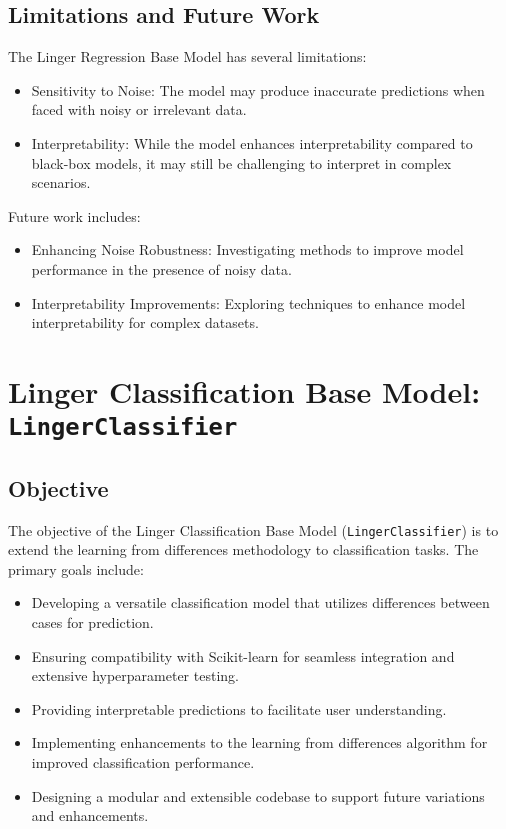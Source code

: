 \documentclass[a4paper, 12pt]{report}
\begin{document}
\subsection{Limitations and Future Work}
The Linger Regression Base Model has several limitations:
\begin{itemize}
    \item Sensitivity to Noise: The model may produce inaccurate predictions when faced with noisy or irrelevant data.
    \item Interpretability: While the model enhances interpretability compared to black-box models, it may still be challenging to interpret in complex scenarios.
\end{itemize}
Future work includes:
\begin{itemize}
    \item Enhancing Noise Robustness: Investigating methods to improve model performance in the presence of noisy data.
    \item Interpretability Improvements: Exploring techniques to enhance model interpretability for complex datasets.
\end{itemize}

\section{Linger Classification Base Model: \texttt{LingerClassifier}}

\subsection{Objective}
The objective of the Linger Classification Base Model (\texttt{LingerClassifier}) is to extend the learning from differences methodology to classification tasks. The primary goals include:

\begin{itemize}
    \item Developing a versatile classification model that utilizes differences between cases for prediction.
    \item Ensuring compatibility with Scikit-learn for seamless integration and extensive hyperparameter testing.
    \item Providing interpretable predictions to facilitate user understanding.
    \item Implementing enhancements to the learning from differences algorithm for improved classification performance.
    \item Designing a modular and extensible codebase to support future variations and enhancements.
\end{itemize}
\end{document}
